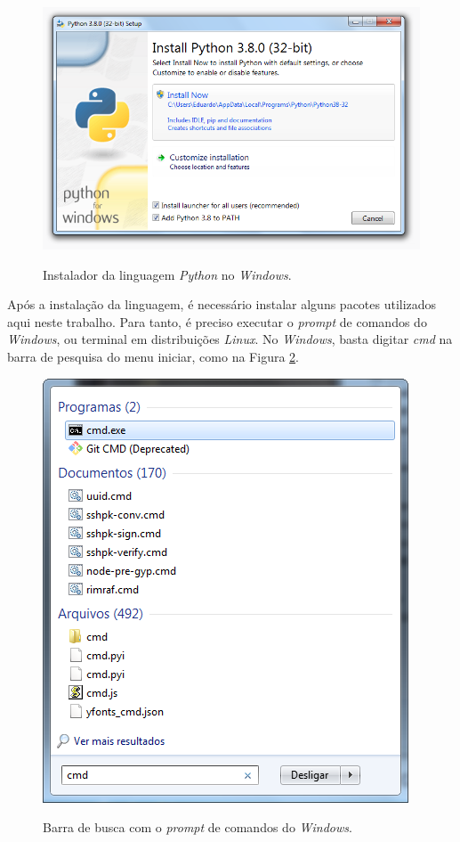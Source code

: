 \documentclass[
	12pt,				%
	openright,			%
    twoside,			%
	a4paper,			%
	chapter=TITLE,		%
	english,			%
	french,				%
	spanish,			%
	brazil				%
	]{abntex2}
\numberwithin{lema}{chapter}
\numberwithin{teorema}{chapter}
\numberwithin{definicao}{chapter}
\numberwithin{exemplo}{chapter}
\numberwithin{figure}{chapter}
\begin{document}
\begin{apendicesenv}
{	\begin{figure}[h]
		\caption{Instalador da linguagem \textit{Python} no \textit{Windows}.}
		\centering
		\includegraphics[scale=0.6]{../figuras/python/python_install.png}
		\label{fig:python_instalador}
	\end{figure}
	
	Após a instalação da linguagem, é necessário instalar alguns pacotes utilizados aqui neste trabalho. Para tanto, é preciso executar o \textit{prompt} de comandos do \textit{Windows}, ou terminal em distribuições \textit{Linux}. No \textit{Windows}, basta digitar \textit{cmd} na barra de pesquisa do menu iniciar, como na Figura \ref{fig:python_barra_busca}.
	
	\begin{figure}[h]
		\caption{Barra de busca com o \textit{prompt} de comandos do \textit{Windows}.}
		\centering
		\includegraphics[scale=0.5]{../figuras/python/barra_busca.png}
		\label{fig:python_barra_busca}
	\end{figure}
	
}
\end{apendicesenv}
\end{document}
